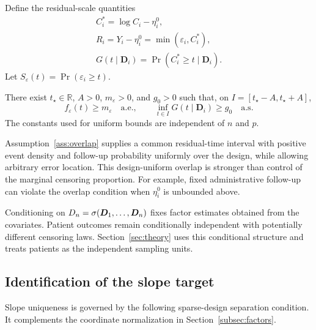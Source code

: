 Define the residual-scale quantities
\begin{equation}
 \begin{gathered}
C_i^*=\log C_i-\eta_i^0,\\
 R_i=Y_i-\eta_i^0=\min(\varepsilon_i,C_i^*),\\
 G(t\mid \bm{D}_i)=\Pr(C_i^*\ge t\mid \bm{D}_i).
 \end{gathered}
 \label{eq:residual-censoring}
\end{equation}
Let $S_\varepsilon(t)=\Pr(\varepsilon_i\ge t)$.

\begin{assumption}
\label{ass:overlap}
There exist $t_\star\in\mathbb R$, $A>0$, $m_\varepsilon>0$, and $g_0>0$ such that, on $I=[t_\star-A,t_\star+A]$,
\begin{equation}
 f_\varepsilon(t)\ge m_\varepsilon\quad\text{a.e.},\qquad
 \inf_{t\in I}G(t\mid \bm{D}_i)\ge g_0\quad\text{a.s.}
 \label{eq:local-overlap}
\end{equation}
The constants used for uniform bounds are independent of $n$ and $p$.
\end{assumption}
Assumption~\ref{ass:overlap} supplies a common residual-time interval with positive event density and follow-up probability uniformly over the design, while allowing arbitrary error location. This design-uniform overlap is stronger than control of the marginal censoring proportion. For example, fixed administrative follow-up can violate the overlap condition when $\eta_i^0$ is unbounded above.

Conditioning on $\mathcal \bm{D}_n=\sigma(\bm{D}_1,\ldots,\bm{D}_n)$ fixes factor estimates obtained from the covariates. Patient outcomes remain conditionally independent with potentially different censoring laws. Section~\ref{sec:theory} uses this conditional structure and treats patients as the independent sampling units.

\subsection{Identification of the slope target}
\label{subsec:identification}
Slope uniqueness is governed by the following sparse-design separation condition. It complements the coordinate normalization in Section~\ref{subsec:factors}.

